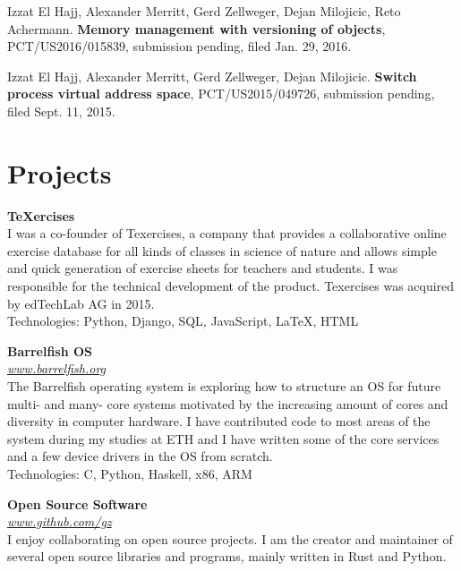 \documentclass[margin,line]{cv}
\begin{document}
\begin{resume}
    Izzat El Hajj, Alexander Merritt, Gerd Zellweger, Dejan Milojicic, Reto
    Achermann. \textbf{Memory management with versioning of objects},
    PCT/US2016/015839, submission pending, filed Jan. 29, 2016.

    Izzat El Hajj, Alexander Merritt, Gerd Zellweger, Dejan Milojicic.
    \textbf{Switch process virtual address space}, PCT/US2015/049726, submission
    pending, filed Sept. 11, 2015.

    \pagebreak

    \section{\mysidestyle Projects}
    \textbf{{\TeX}ercises} \\\vspace{1mm}%
    I was a co-founder of Texercises, a company that provides a collaborative online
    exercise database for all kinds of classes in science of nature and allows
    simple and quick generation of exercise sheets for teachers and students. I was
    responsible for the technical development of the product. Texercises was
    acquired by edTechLab AG in 2015.\\
    Technologies: Python, Django, SQL, JavaScript, LaTeX, HTML

    \textbf{Barrelfish OS} \\\vspace{1mm}%
    \textsl{\url{www.barrelfish.org}} \hfill \\
    The Barrelfish operating system is exploring how to structure an OS for future
    multi- and many- core systems motivated by the increasing amount of cores and
    diversity in computer hardware. I have contributed code to most areas of the
    system during my studies at ETH and I have written some of the core services
    and a few device drivers in the OS from scratch.\\ Technologies: C, Python,
    Haskell, x86, ARM

    \textbf{Open Source Software} \\\vspace{1mm}%
    \textsl{\url{www.github.com/gz}} \hfill \\
    I enjoy collaborating on open source projects. I am the creator and maintainer
    of several open source libraries and programs, mainly written in Rust and
    Python.


\end{resume}
\end{document}
